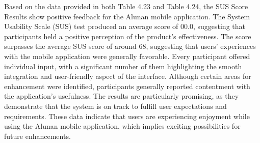 \begin{enumerate}[A.]
    Based on the data provided in both Table 4.23 and Table 4.24, the SUS Score Results show positive feedback for the Alunan mobile application. The System Usability Scale (SUS) test produced an average score of 00.0, suggesting that participants held a positive perception of the product's effectiveness. The score surpasses the average SUS score of around 68, suggesting that users' experiences with the mobile application were generally favorable. Every participant offered individual input, with a significant number of them highlighting the smooth integration and user-friendly aspect of the interface. Although certain areas for enhancement were identified, participants generally reported contentment with the application's usefulness. The results are particularly promising, as they demonstrate that the system is on track to fulfill user expectations and requirements. These data indicate that users are experiencing enjoyment while using the Alunan mobile application, which implies exciting possibilities for future enhancements.
\end{enumerate}